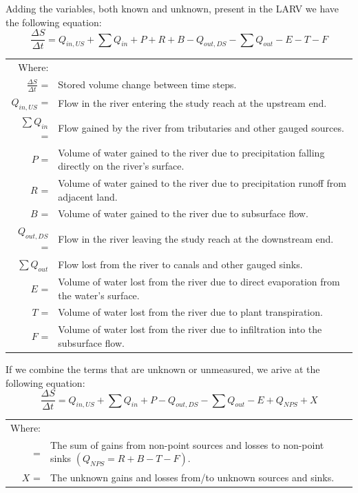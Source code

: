 \begin{linenumbers}
Adding the variables, both known and unknown, present in the LARV we have the following equation:
\begin{equation}
	\frac{\Delta S}{\Delta t} = Q_{in,US} + \sum Q_{in} + P + R + B - Q_{out,DS} - \sum Q_{out} - E - T - F 
\end{equation}
\begin{longtable}{rl}
	Where: \\
	$\frac{\Delta S}{\Delta t}$ =&Stored volume change between time steps.\\
	$ Q_{in,US} $ = & Flow in the river entering the study reach at the upstream end.\\
	$ \sum Q_{in} $ = & Flow gained by the river from tributaries and other gauged sources.\\
	$ P $ = & Volume of water gained to the river due to precipitation falling directly on the river's surface.\\
	$ R $ = & Volume of water gained to the river due to precipitation runoff from adjacent land. \\
	$ B $ = & Volume of water gained to the river due to subsurface flow. \\
	$ Q_{out,DS} $ = & Flow in the river leaving the study reach at the downstream end.\\
	$ \sum Q_{out} $ & Flow lost from the river to canals and other gauged sinks.\\
	$ E $ = & Volume of water lost from the river due to direct evaporation from the water's surface.\\
	$ T $ = & Volume of water lost from the river due to plant transpiration.\\
	$ F $ = & Volume of water lost from the river due to infiltration into the subsurface flow.\\
\end{longtable}

If we combine the terms that are unknown or unmeasured, we arive at the following equation:
\begin{equation}\label{eq:water01}
	\frac{\Delta S}{\Delta t} = Q_{in,US} + \sum Q_{in} + P - Q_{out,DS} - \sum Q_{out} - E + Q_{NPS} + X
\end{equation}
\begin{tabularx}{6in}{rX}
	Where: \\
	\Qnps = & The sum of gains from non-point sources and losses to non-point sinks $ \left( Q_{NPS} = R + B - T - F \right) $.\\ 
	$ X $ = & The unknown gains and losses from/to unknown sources and sinks.\\
\end{tabularx}\\


\end{linenumbers}
